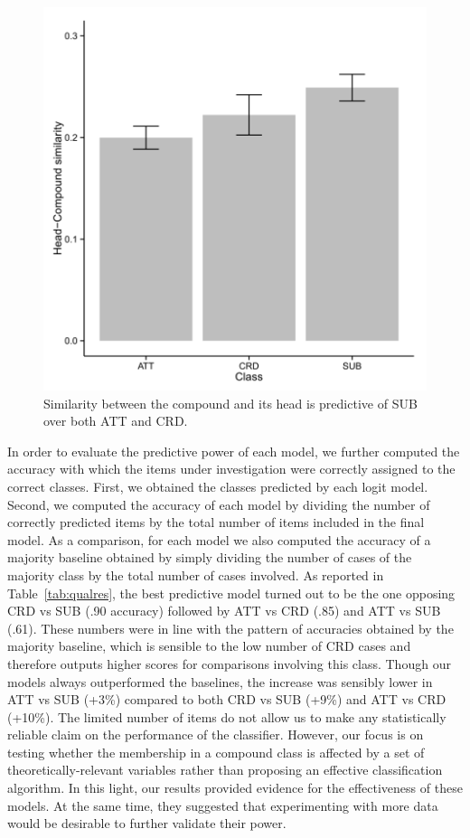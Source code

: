 \documentclass[output=paper]{langsci/langscibook}
\begin{document}
\begin{figure}[t!]
\begin{center}
\includegraphics[scale=0.9]{figures/barplot2.png}
\caption{Similarity between the compound and its head is predictive of SUB over both ATT and CRD.}\label{fig:bar2}
\end{center}
\end{figure}


In order to evaluate the predictive power of each model, we further computed the accuracy with which the items under investigation were correctly assigned to the correct classes. First, we obtained the classes predicted by each logit model. Second, we computed the accuracy of each model by dividing the number of correctly predicted items by the total number of items included in the final model. As a comparison, for each model we also computed the accuracy of a majority baseline obtained by simply dividing the number of cases of the majority class by the total number of cases involved.  As reported in Table~\ref{tab:qualres}, the best predictive model turned out to be the one opposing CRD vs SUB (.90 accuracy) followed by ATT vs CRD (.85) and ATT vs SUB (.61). These numbers were in line with the pattern of accuracies obtained by the majority baseline, which is sensible to the low number of CRD cases and therefore outputs higher scores for comparisons involving this class. Though our models always outperformed the baselines, the increase was sensibly lower in ATT vs SUB (+3\%) compared to both CRD vs SUB (+9\%) and ATT vs CRD (+10\%). The limited number of items do not allow us to make any statistically reliable claim on the performance of the classifier. However, our focus is on testing whether the membership in a compound class is affected by a set of theoretically-relevant variables rather than proposing an effective classification algorithm. In this light, our results provided evidence for the effectiveness of these models. At the same time, they suggested that experimenting with more data would be desirable to further validate their power.
\end{document}
